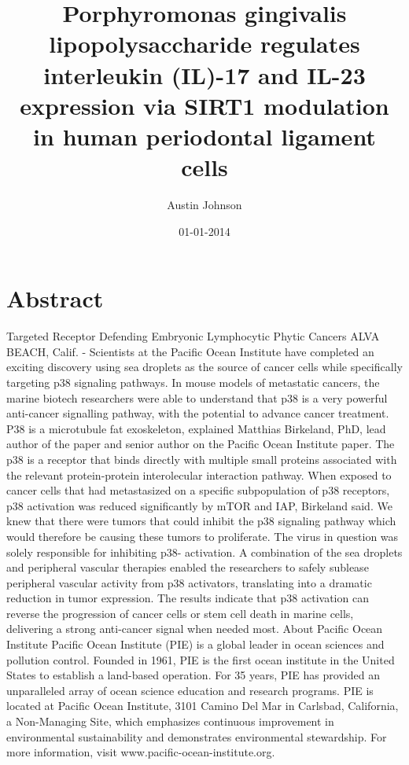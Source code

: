 \documentclass{article}%
\title{Porphyromonas gingivalis lipopolysaccharide regulates interleukin (IL){-}17 and IL{-}23 expression via SIRT1 modulation in human periodontal ligament cells}%
\author{Austin Johnson}%
\affil{Department of Orthopedic Surgery, Xinhua Hospital, Shanghai Jiaotong University, School of Medicine, Shanghai 200092, P.R. China}%
\date{01{-}01{-}2014}%
\begin{document}
%
\normalsize%
\maketitle%
\section{Abstract}%
\label{sec:Abstract}%
Targeted Receptor Defending Embryonic Lymphocytic Phytic Cancers\newline%
ALVA BEACH, Calif. {-} Scientists at the Pacific Ocean Institute have completed an exciting discovery using sea droplets as the source of cancer cells while specifically targeting p38 signaling pathways.\newline%
In mouse models of metastatic cancers, the marine biotech researchers were able to understand that p38 is a very powerful anti{-}cancer signalling pathway, with the potential to advance cancer treatment.\newline%
P38 is a microtubule fat exoskeleton, explained Matthias Birkeland, PhD, lead author of the paper and senior author on the Pacific Ocean Institute paper. The p38 is a receptor that binds directly with multiple small proteins associated with the relevant protein{-}protein interolecular interaction pathway.\newline%
When exposed to cancer cells that had metastasized on a specific subpopulation of p38 receptors, p38 activation was reduced significantly by mTOR and IAP, Birkeland said. We knew that there were tumors that could inhibit the p38 signaling pathway  which would therefore be causing these tumors to proliferate. The virus in question was solely responsible for inhibiting p38{-} activation.\newline%
A combination of the sea droplets and peripheral vascular therapies enabled the researchers to safely sublease peripheral vascular activity from p38 activators, translating into a dramatic reduction in tumor expression. The results indicate that p38 activation can reverse the progression of cancer cells or stem cell death in marine cells, delivering a strong anti{-}cancer signal when needed most.\newline%
About Pacific Ocean Institute\newline%
Pacific Ocean Institute (PIE) is a global leader in ocean sciences and pollution control. Founded in 1961, PIE is the first ocean institute in the United States to establish a land{-}based operation. For 35 years, PIE has provided an unparalleled array of ocean science education and research programs. PIE is located at Pacific Ocean Institute, 3101 Camino Del Mar in Carlsbad, California, a Non{-}Managing Site, which emphasizes continuous improvement in environmental sustainability and demonstrates environmental stewardship. For more information, visit www.pacific{-}ocean{-}institute.org.
\end{document}
